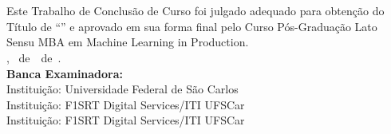 \imprimircapa


\imprimirfolhaderosto*

\begin{fichacatalografica}
	
\end{fichacatalografica}

\begin{folhadeaprovacao}
	\OnehalfSpacing
	\centering
	\imprimirautor\\%
	\vspace{24pt}		
	\textbf{\imprimirtitulo}%
	\ifnotempty{\imprimirsubtitulo}{:~\imprimirsubtitulo}\\%
	\vspace*{\baselineskip}
	Este Trabalho de Conclusão de Curso foi julgado adequado para obtenção do Título de ``\imprimirformacao'' e aprovado em sua forma final pelo Curso Pós-Graduação Lato Sensu MBA em Machine Learning in Production.\\
	\vspace{12pt}
	\imprimirlocal, \imprimirdia~de~\imprimirmes~de~\imprimirano.\\
	
	\vspace*{18pt}
	\textbf{Banca Examinadora:}\\
	
	\vspace*{24pt}
	\assinatura{\OnehalfSpacing \imprimirbancaa}
	\vspace{6pt}
	Instituição: Universidade Federal de São Carlos\\
	
	\vspace*{24pt}
	\assinatura{\OnehalfSpacing \imprimirbancab}
	\vspace{6pt}
	Instituição: F1SRT Digital Services/ITI UFSCar\\
	
	\vspace*{24pt}
	\assinatura{\OnehalfSpacing \imprimirbancac}
	\vspace{6pt}
	Instituição: F1SRT Digital Services/ITI UFSCar\\
	
\end{folhadeaprovacao}

